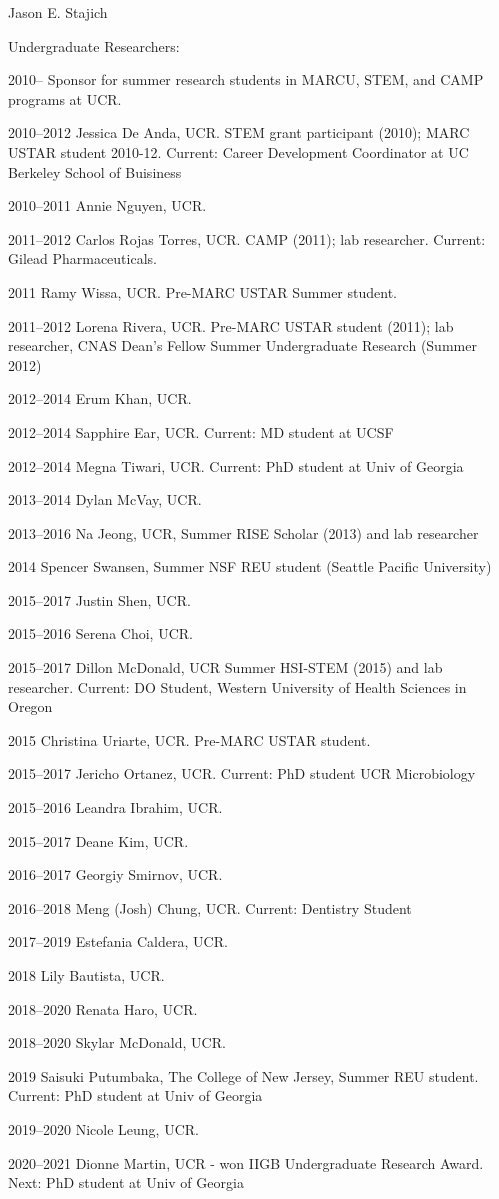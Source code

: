 \documentclass[10pt]{article}
\begin{document}
\begin{cv}{\centerline{Jason E. Stajich}}
\begin{cvlistcompact}{Undergraduate Researchers:}
\item[2010--] Sponsor for summer research students in MARCU, STEM, and CAMP
  programs at UCR.
\item [2010--2012] Jessica De Anda, UCR. STEM grant participant
  (2010); MARC USTAR student 2010-12. Current: Career Development Coordinator at UC Berkeley School of Buisiness
\item [2010--2011] Annie Nguyen, UCR.
\item [2011--2012] Carlos Rojas Torres, UCR. CAMP (2011); lab
  researcher. Current: Gilead Pharmaceuticals.
\item [2011] Ramy Wissa, UCR. Pre-MARC USTAR Summer student.
\item [2011--2012] Lorena Rivera, UCR. Pre-MARC USTAR student (2011); lab
  researcher, CNAS Dean's Fellow Summer Undergraduate Research (Summer 2012)
\item [2012--2014] Erum Khan, UCR.
\item [2012--2014] Sapphire Ear, UCR. Current: MD student at UCSF
\item [2012--2014] Megna Tiwari, UCR. Current: PhD student at Univ of Georgia
\item [2013--2014] Dylan McVay, UCR.
\item [2013--2016] Na Jeong, UCR, Summer RISE Scholar (2013) and lab researcher
\item [2014] Spencer Swansen, Summer NSF REU student (Seattle Pacific University)
\item [2015--2017] Justin Shen, UCR.
\item [2015--2016] Serena Choi, UCR.
\item [2015--2017] Dillon McDonald, UCR Summer HSI-STEM (2015) and lab researcher. Current: DO Student, Western University of Health Sciences in Oregon
\item [2015] Christina Uriarte, UCR. Pre-MARC USTAR student.
\item [2015--2017] Jericho Ortanez, UCR. Current: PhD student UCR Microbiology
\item [2015--2016] Leandra Ibrahim, UCR.
\item [2015--2017] Deane Kim, UCR.
\item [2016--2017] Georgiy Smirnov, UCR.
\item [2016--2018] Meng (Josh) Chung, UCR. Current: Dentistry Student
\item [2017--2019] Estefania Caldera, UCR.
\item [2018] Lily Bautista, UCR.
\item [2018--2020] Renata Haro, UCR.
\item [2018--2020] Skylar McDonald, UCR.
\item [2019] Saisuki Putumbaka, The College of New Jersey, Summer REU student. Current: PhD student at Univ of Georgia
\item [2019--2020] Nicole Leung, UCR.
\item [2020--2021] Dionne Martin, UCR - won IIGB Undergraduate Research Award. Next: PhD student at Univ of Georgia


\end{cvlistcompact}
\end{cv}
\end{document}
